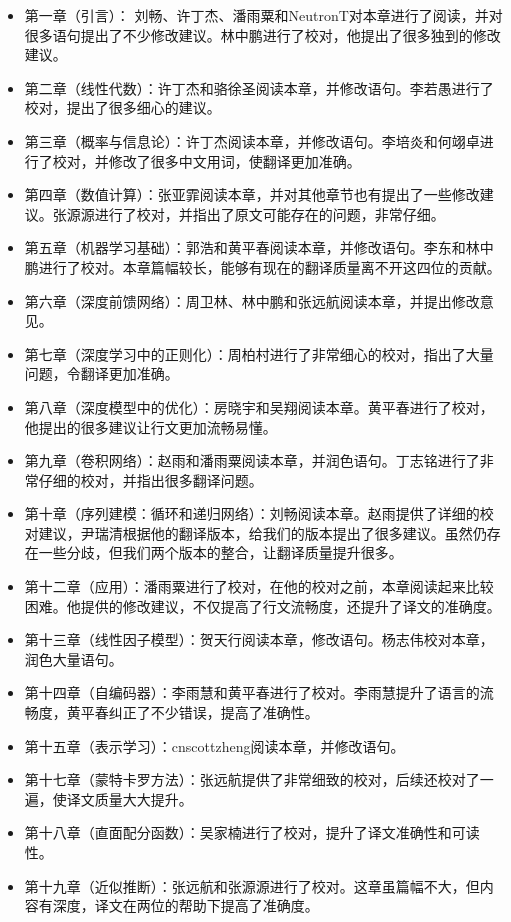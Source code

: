 \begin{itemize}
\item  第一章（引言）： 刘畅、许丁杰、潘雨粟和NeutronT对本章进行了阅读，并对很多语句提出了不少修改建议。林中鹏进行了校对，他提出了很多独到的修改建议。
\item  第二章（线性代数）：许丁杰和骆徐圣阅读本章，并修改语句。李若愚进行了校对，提出了很多细心的建议。
\item  第三章（概率与信息论）：许丁杰阅读本章，并修改语句。李培炎和何翊卓进行了校对，并修改了很多中文用词，使翻译更加准确。
\item  第四章（数值计算）：张亚霏阅读本章，并对其他章节也有提出了一些修改建议。张源源进行了校对，并指出了原文可能存在的问题，非常仔细。
\item  第五章（机器学习基础）：郭浩和黄平春阅读本章，并修改语句。李东和林中鹏进行了校对。本章篇幅较长，能够有现在的翻译质量离不开这四位的贡献。
\item  第六章（深度前馈网络）：周卫林、林中鹏和张远航阅读本章，并提出修改意见。
\item  第七章（深度学习中的正则化）：周柏村进行了非常细心的校对，指出了大量问题，令翻译更加准确。
\item  第八章（深度模型中的优化）：房晓宇和吴翔阅读本章。黄平春进行了校对，他提出的很多建议让行文更加流畅易懂。
\item  第九章（卷积网络）：赵雨和潘雨粟阅读本章，并润色语句。丁志铭进行了非常仔细的校对，并指出很多翻译问题。
\item  第十章（序列建模：循环和递归网络）：刘畅阅读本章。赵雨提供了详细的校对建议，尹瑞清根据他的翻译版本，给我们的版本提出了很多建议。虽然仍存在一些分歧，但我们两个版本的整合，让翻译质量提升很多。
\item  第十二章（应用）：潘雨粟进行了校对，在他的校对之前，本章阅读起来比较困难。他提供的修改建议，不仅提高了行文流畅度，还提升了译文的准确度。
\item  第十三章（线性因子模型）：贺天行阅读本章，修改语句。杨志伟校对本章，润色大量语句。
\item  第十四章（自编码器）：李雨慧和黄平春进行了校对。李雨慧提升了语言的流畅度，黄平春纠正了不少错误，提高了准确性。
\item  第十五章（表示学习）：cnscottzheng阅读本章，并修改语句。
\item  第十七章（蒙特卡罗方法）：张远航提供了非常细致的校对，后续还校对了一遍，使译文质量大大提升。
\item  第十八章（直面配分函数）：吴家楠进行了校对，提升了译文准确性和可读性。
\item  第十九章（近似推断）：张远航和张源源进行了校对。这章虽篇幅不大，但内容有深度，译文在两位的帮助下提高了准确度。
\end{itemize}
 
